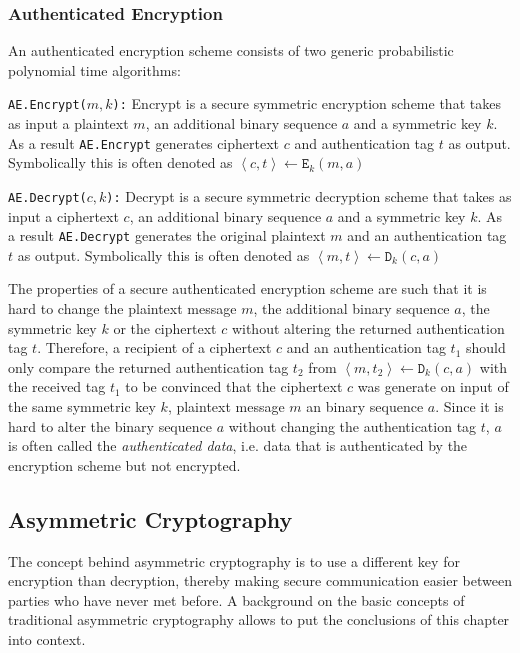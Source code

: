 \subsubsection{Authenticated Encryption}
\label{sec:authenticated_encryption}
An authenticated encryption scheme consists of two generic probabilistic polynomial time algorithms:

\begin{description}
 \item \texttt{AE.Encrypt($m, k$):} Encrypt is a secure symmetric encryption scheme that takes as input a plaintext $m$, an additional binary sequence $a$ and a symmetric key $k$. As a result \texttt{AE.Encrypt} generates ciphertext $c$ and authentication tag $t$ as output. Symbolically this is often denoted as  $\left< c, t \right> \leftarrow \mathtt{E}_k(m, a)$
 \item \texttt{AE.Decrypt($c, k$):} Decrypt is a secure symmetric decryption scheme that takes as input a ciphertext $c$, an additional binary sequence $a$ and a symmetric key $k$. As a result \texttt{AE.Decrypt} generates the original plaintext $m$ and an authentication tag $t$ as output. Symbolically this is often denoted as $\left< m, t \right> \leftarrow \mathtt{D}_k(c, a)$
\end{description}

The properties of a secure authenticated encryption scheme are such that it is hard to change the plaintext message $m$, the additional binary sequence $a$, the symmetric key $k$ or the ciphertext $c$ without altering the returned authentication tag $t$. Therefore, a recipient of a ciphertext $c$ and an authentication tag $t_1$ should only compare the returned authentication tag $t_2$ from $\left< m, t_2 \right> \leftarrow \mathtt{D}_k(c,a)$ with the received tag $t_1$ to be convinced that the ciphertext $c$ was generate on input of the same symmetric key $k$, plaintext message $m$ an binary sequence $a$. Since it is hard to alter the binary sequence $a$ without changing the authentication tag $t$, $a$ is often called the \textit{authenticated data}, i.e. data that is authenticated by the encryption scheme but not encrypted.

\subsection{Asymmetric Cryptography}
\label{sec:asymmetric_cryptography}
The concept behind asymmetric cryptography is to use a different key for encryption than decryption, thereby making secure communication easier between parties who have never met before. A background on the basic concepts of traditional asymmetric cryptography allows to put the conclusions of this chapter into context.

